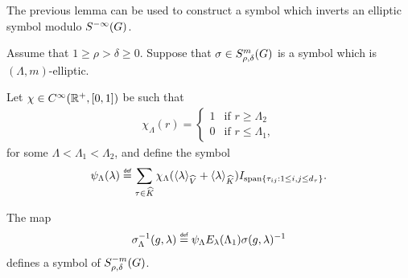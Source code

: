 The previous lemma can be used to construct a symbol
which inverts an elliptic symbol modulo ${S^{-\infty} (G)}$.

\begin{proposition}
\label{proposition:inverse_of_elliptic_symbol}
    Assume that $1 \geq \rho > \delta \geq 0$.
    Suppose that $\sigma \in S^{m}_{\rho, \delta}(G)$ is a symbol which is $(\Lambda, m)$-elliptic.

    Let $\chi \in {C^\infty(\mathbb{R}^+, [0, 1])}$ be such that
    \begin{align*}
        \chi_\Lambda(r) =
        \begin{cases}
            1 & \text{if } r \geq \Lambda_2\\
            0 & \text{if } r \leq \Lambda_1,
        \end{cases}
    \end{align*}
    for some $\Lambda < \Lambda_1 < \Lambda_2$,
    and define the symbol
    \begin{align*}
        \psi_\Lambda(\lambda)
        \defeq \sum_{\tau \in \dualGroup \CompactGroup}
        \chi_\Lambda(\JapaneseBracket \VectorSpace \lambda + \JapaneseBracket \CompactGroup \lambda) \Id {\Span \{\tau_{i j} : 1 \leq i, j \leq \dimRep \tau\}}.
    \end{align*}

    The map
    \begin{align*}
        \sigma_\Lambda^{-1}(g, \lambda)
        \defeq \psi_\Lambda E_\lambda(\Lambda_1) \sigma(g, \lambda)^{-1}
    \end{align*}
    defines a symbol of $S^{-m}_{\rho, \delta}(G)$.
\end{proposition}
